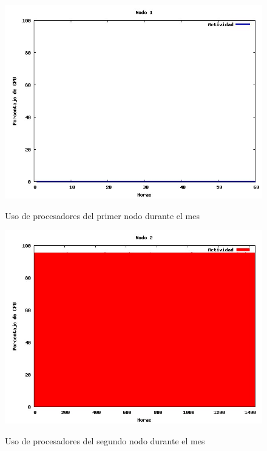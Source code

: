 \documentclass[11pt,a4paper,oneside,openany]{report}
\begin{document}
\begin{figure}[htb]
\centering
\includegraphics[width=0.9\linewidth]{grafico1.jpg}\\
\caption{Uso de procesadores del primer nodo durante el mes}
\end{figure}

\begin{figure}[htb]
\centering
\includegraphics[width=0.9\linewidth]{grafico2.jpg}\\
\caption{Uso de procesadores del segundo nodo durante el mes}
\end{figure}
\end{document}
